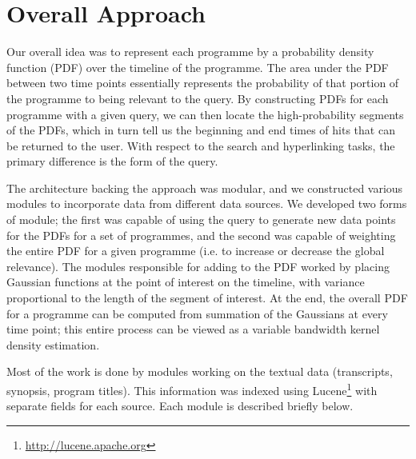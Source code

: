 \documentclass{../acm_proc_article-me11_tweaked}
\begin{document}
\section{Overall Approach}
Our overall idea was to represent each programme by a probability density function (PDF) over the timeline of the programme. The area under the PDF between two time points essentially represents the probability of that portion of the programme to being relevant to the query. By constructing PDFs for each programme with a given query, we can then locate the high-probability segments of the PDFs, which in turn tell us the beginning and end times of hits that can be returned to the user. With respect to the search and hyperlinking tasks, the primary difference is the form of the query.

The architecture backing the approach was modular, and we constructed various modules to incorporate data from different data sources. We developed two forms of module; the first was capable of using the query to generate new data points for the PDFs for a set of programmes, and the second was capable of weighting the entire PDF for a given programme (i.e. to increase or decrease the global relevance). The modules responsible for adding to the PDF worked by placing Gaussian functions at the point of interest on the timeline, with variance proportional to the length of the segment of interest. At the end, the overall PDF for a programme can be computed from summation of the Gaussians at every time point; this entire process can be viewed as a variable bandwidth kernel density estimation. 

Most of the work is done by modules working on the textual data (transcripts, synopsis, program titles). This information was indexed using Lucene\footnote{\url{http://lucene.apache.org}} with separate fields for each source. Each module is described briefly below.
\end{document}
